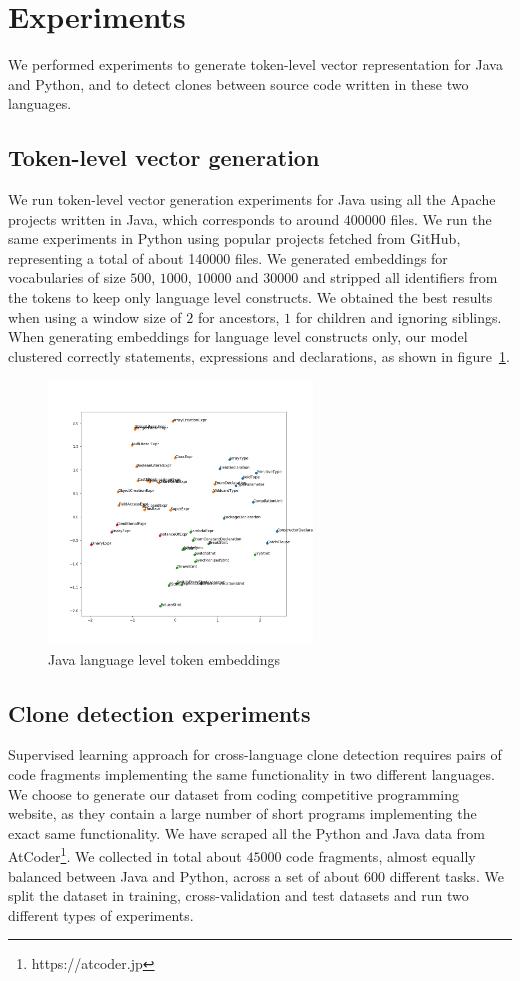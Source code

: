 \documentclass[11pt,a4paper,twocolumn]{article}
\begin{document}
\section{Experiments}
We performed experiments to generate token-level vector representation for Java
and Python, and to detect clones between source code written in these two
languages.
\subsection{\label{ssec:embedding-generation-experiment}Token-level vector generation}
We run token-level vector generation experiments for Java using all the Apache
projects written in Java, which corresponds to around $400000$ files. We run the
same experiments in Python using popular projects fetched from GitHub,
representing a total of about 140000 files.
We generated embeddings for vocabularies of size $500$, $1000$, $10000$ and
$30000$ and stripped all identifiers from the tokens to keep only language level
constructs.
We obtained the best results when using a window size of $2$ for ancestors, $1$
for children and ignoring siblings.
When generating embeddings for language level constructs only, our model
clustered correctly statements, expressions and declarations, as shown
in figure~\ref{fig:token-embeddings}.
\begin{figure}
  \centering\includegraphics[width=7cm]{../images/java-embeddings.png}
  \vskip -10mm
  \caption{\label{fig:token-embeddings}Java language level token embeddings}
\end{figure}
\subsection{Clone detection experiments}
Supervised learning approach for cross-language clone detection requires pairs
of code fragments implementing
the same functionality in two different languages.
We choose to generate our dataset from coding competitive programming website,
as they contain a large number of short programs implementing the exact same
functionality. We have scraped all the Python and Java data
from AtCoder\footnote{https://atcoder.jp}. We collected in total about $45000$
code fragments, almost equally balanced between Java and Python, across a set of
about 600 different tasks. We split the dataset in training, cross-validation
and test datasets and run two different types of experiments.
\end{document}
